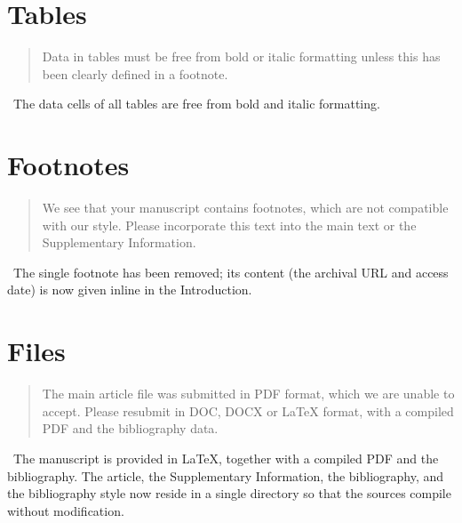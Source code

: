 \documentclass[11pt]{article}
\newcommand{\reply}{\vspace{0.25em}{\color{ForestGreen}\textbf{Reply:}}\ }
\newenvironment{editorcomment}
{\vspace{0.5em}\begin{quote}\color{NavyBlue}}
{\end{quote}}
\begin{document}
\section*{Tables}

\begin{editorcomment}
Data in tables must be free from bold or italic formatting unless this has been
clearly defined in a footnote.
\end{editorcomment}

\reply The data cells of all tables are free from bold and italic formatting.

\section*{Footnotes}

\begin{editorcomment}
We see that your manuscript contains footnotes, which are not compatible with our
style. Please incorporate this text into the main text or the Supplementary
Information.
\end{editorcomment}

\reply The single footnote has been removed; its content (the archival URL and
access date) is now given inline in the Introduction.

\section*{Files}

\begin{editorcomment}
The main article file was submitted in PDF format, which we are unable to accept.
Please resubmit in DOC, DOCX or LaTeX format, with a compiled PDF and the
bibliography data.
\end{editorcomment}

\reply The manuscript is provided in LaTeX, together with a compiled PDF and the
bibliography. The article, the Supplementary Information, the bibliography, and
the bibliography style now reside in a single directory so that the sources
compile without modification.
\end{document}
